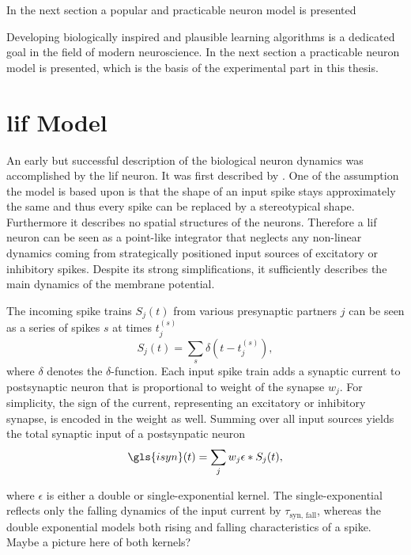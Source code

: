 In the next section a popular and practicable neuron model is presented 

Developing biologically inspired and plausible learning algorithms is a dedicated goal in the field of modern neuroscience. In the next section a practicable neuron model is presented, which is the basis of the experimental part in this thesis.

\section{\gls{lif} Model}

An early but successful description of the biological neuron dynamics was accomplished by the \gls{lif} neuron. It was first described by \cite{lapicque1907recherches}. One of the assumption the model is based upon is that the shape of an input spike stays approximately the same and thus every spike can be replaced by a stereotypical shape. Furthermore it describes no spatial structures of the neurons. Therefore a \gls{lif} neuron can be seen as a point-like integrator that neglects any non-linear dynamics coming from strategically positioned input sources of excitatory or inhibitory spikes. Despite its strong simplifications, it sufficiently describes the main dynamics of the membrane potential. 

The incoming spike trains $S_j(t)$ from various presynaptic partners $j$ can be seen as a series of spikes $s$ at times $t_j^{(s)}$
\begin{equation}
S_j(t) = \sum_s \delta(t - t_j^{(s)}),
\end{equation}
where $\delta$ denotes the $\delta$-function. Each input spike train adds a synaptic current to postsynaptic neuron that is proportional to weight of the synapse $w_j$. For simplicity, the sign of the current, representing an excitatory or inhibitory synapse, is encoded in the weight as well. Summing over all input sources yields the total synaptic input of a postsynpatic neuron
\begin{equation}
\label{synpatic_input}
\gls{isyn}(t) = \sum_j w_j \epsilon \ast S_j(t),
\end{equation}

where $\epsilon$ is either a double or single-exponential kernel. The single-exponential reflects only the falling dynamics of the input current by $\tau_\text{syn, fall}$, whereas the double exponential models both rising and falling characteristics of a spike. Maybe a picture here of both kernels?

